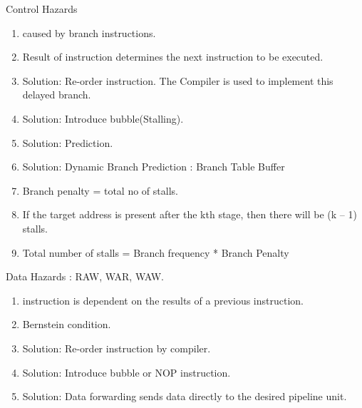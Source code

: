 \begin{enumerate}
    \item Control Hazards
    \begin{enumerate}
        \item caused by branch instructions.
        \item Result of instruction determines the next instruction to be executed.
        \item Solution: Re-order instruction. The Compiler is used to implement this delayed branch.
        \item Solution: Introduce bubble(Stalling).
        \item Solution: Prediction.
        \item Solution: Dynamic Branch Prediction : Branch Table Buffer
        \item Branch penalty = total no of stalls.
        \item If the target address is present after the kth stage, then there will be (k – 1) stalls.
        \item Total number of stalls = Branch frequency * Branch Penalty
    \end{enumerate}

    \begin{minipage}{\linewidth}
    \item Data Hazards : RAW, WAR, WAW.
    \begin{enumerate}
        \item instruction is dependent on the results of a previous instruction.
        \item Bernstein condition.
        \item Solution: Re-order instruction by compiler.
        \item Solution: Introduce bubble or NOP instruction.
        \item Solution: Data forwarding sends data directly to the desired pipeline unit.
    \end{enumerate}

    \newpage


\end{minipage}
\end{enumerate}
